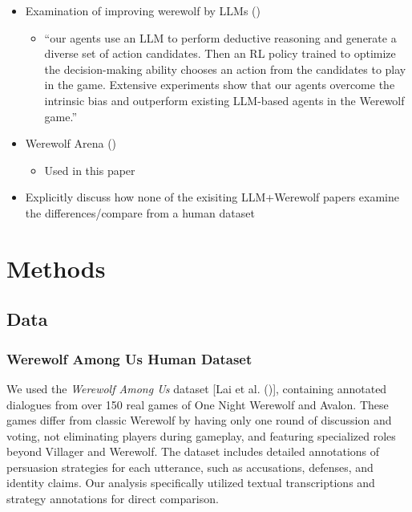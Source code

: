 \documentclass[
  letterpaper,
  DIV=11,
  numbers=noendperiod]{scrreprt}
\providecommand{\tightlist}{%
  \setlength{\itemsep}{0pt}\setlength{\parskip}{0pt}}
\begin{document}
\begin{itemize}
\tightlist
\item
  Examination of improving werewolf by LLMs
  ()

  \begin{itemize}
  \tightlist
  \item
    ``our agents use an LLM to perform deductive reasoning and generate
    a diverse set of action candidates. Then an RL policy trained to
    optimize the decision-making ability chooses an action from the
    candidates to play in the game. Extensive experiments show that our
    agents overcome the intrinsic bias and outperform existing LLM-based
    agents in the Werewolf game.''
  \end{itemize}
\item
  Werewolf Arena ()

  \begin{itemize}
  \tightlist
  \item
    Used in this paper
  \end{itemize}
\item
  Explicitly discuss how none of the exisiting LLM+Werewolf papers
  examine the differences/compare from a human dataset
\end{itemize}

\chapter{Methods}\label{methods}

\section{Data}\label{data}

\subsection{Werewolf Among Us Human
Dataset}\label{werewolf-among-us-human-dataset}

We used the \emph{Werewolf Among Us} dataset {[}Lai et al.
(){]}, containing
annotated dialogues from over 150 real games of One Night Werewolf and
Avalon. These games differ from classic Werewolf by having only one
round of discussion and voting, not eliminating players during gameplay,
and featuring specialized roles beyond Villager and Werewolf. The
dataset includes detailed annotations of persuasion strategies for each
utterance, such as accusations, defenses, and identity claims. Our
analysis specifically utilized textual transcriptions and strategy
annotations for direct comparison.
\end{document}
